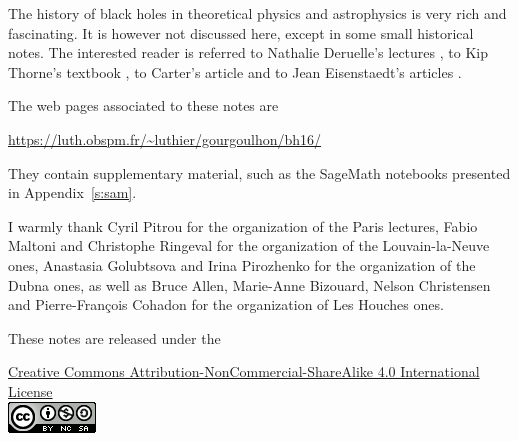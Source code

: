 The history of black holes in theoretical physics and astrophysics is
very rich and fascinating. It is however not discussed here, except in some
small historical notes. The interested
reader is referred to Nathalie Deruelle's lectures \cite{Derue09}, to Kip Thorne's
textbook \cite{Thorn94}, to Carter's article \cite{Carte06}
and to Jean Eisenstaedt's articles \cite{Eisen82,Eisen93}.


The web pages associated to these notes are
\begin{center}
\url{https://luth.obspm.fr/~luthier/gourgoulhon/bh16/}
\end{center}
They contain supplementary material, such as the SageMath notebooks presented in
Appendix~\ref{s:sam}.

\vspace{2ex}

I warmly thank Cyril Pitrou for the organization of the Paris lectures,
Fabio Maltoni and Christophe Ringeval for the organization of the Louvain-la-Neuve ones,
Anastasia Golubtsova and Irina Pirozhenko for the
organization of the Dubna ones, as well as Bruce Allen, Marie-Anne Bizouard, Nelson
Christensen and Pierre-François Cohadon for the organization of Les Houches ones.

\vspace{3ex}
These notes are released under the
\begin{center}
\href{https://creativecommons.org/licenses/by-nc-sa/4.0/}{{Creative Commons Attribution-NonCommercial-ShareAlike 4.0 International License}}\\[1ex]
\includegraphics[height=0.03\textheight]{cc_license.png}
\end{center}

